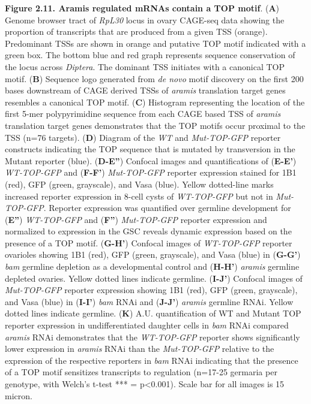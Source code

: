 \documentclass[12pt,oneside]{reedthesis}
\begin{document}
\textbf{\hfill\break
}

\textbf{Figure 2.11. Aramis regulated mRNAs contain a TOP motif}. (\textbf{A}) Genome
browser tract of \emph{RpL30} locus in ovary CAGE-seq data showing the
proportion of transcripts that are produced from a given TSS (orange).
Predominant TSSs are shown in orange and putative TOP motif indicated
with a green box. The bottom blue and red graph represents sequence
conservation of the locus across \emph{Diptera}. The dominant TSS initiates
with a canonical TOP motif. (\textbf{B}) Sequence logo generated from \emph{de
novo} motif discovery on the first 200 bases downstream of CAGE derived
TSSs of \emph{aramis} translation target genes resembles a canonical TOP
motif. (\textbf{C}) Histogram representing the location of the first 5-mer
polypyrimidine sequence from each CAGE based TSS of \emph{aramis} translation
target genes demonstrates that the TOP motifs occur proximal to the TSS
(n=76 targets). (\textbf{D}) Diagram of the \emph{WT} and \emph{Mut-TOP-GFP} reporter
constructs indicating the TOP sequence that is mutated by transversion
in the Mutant reporter (blue). (\textbf{D-E''}) Confocal images and
quantifications of (\textbf{E-E'}) \emph{WT-TOP-GFP} and (\textbf{F-F'}) \emph{Mut-TOP-GFP}
reporter expression stained for 1B1 (red), GFP (green, grayscale), and
Vasa (blue). Yellow dotted-line marks increased reporter expression in
8-cell cysts of \emph{WT-TOP-GFP} but not in \emph{Mut-TOP-GFP}. Reporter
expression was quantified over germline development for (\textbf{E''})
\emph{WT-TOP-GFP} and (\textbf{F''}) \emph{Mut-TOP-GFP} reporter expression and
normalized to expression in the GSC reveals dynamic expression based on
the presence of a TOP motif. (\textbf{G-H'}) Confocal images of \emph{WT-TOP-GFP}
reporter ovarioles showing 1B1 (red), GFP (green, grayscale), and Vasa
(blue) in (\textbf{G-G'}) \emph{bam} germline depletion as a developmental control
and (\textbf{H-H'}) \emph{aramis} germline depleted ovaries. Yellow dotted lines
indicate germline. (\textbf{I-J'}) Confocal images of \emph{Mut-TOP-GFP} reporter
expression showing 1B1 (red), GFP (green, grayscale), and Vasa (blue) in
(\textbf{I-I'}) \emph{bam} RNAi and (\textbf{J-J'}) \emph{aramis} germline RNAi. Yellow
dotted lines indicate germline. (\textbf{K}) A.U. quantification of WT and
Mutant TOP reporter expression in undifferentiated daughter cells in
\emph{bam} RNAi compared \emph{aramis} RNAi demonstrates that the \emph{WT-TOP-GFP}
reporter shows significantly lower expression in \emph{aramis} RNAi than the
\emph{Mut-TOP-GFP} relative to the expression of the respective reporters in
\emph{bam} RNAi indicating that the presence of a TOP motif sensitizes
transcripts to regulation (n=17-25 germaria per genotype, with Welch's
t-test *** = p\textless0.001). Scale bar for all images is 15 micron.
\end{document}
